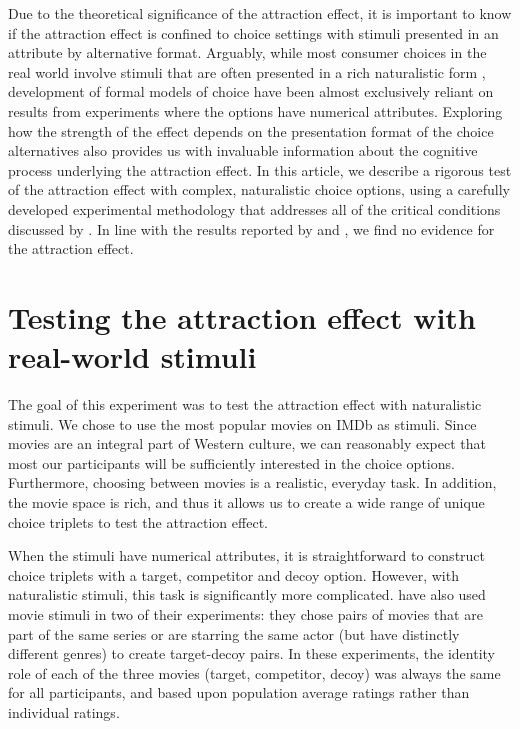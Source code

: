 \documentclass[12pt, a4paper]{article}
\begin{document}
Due to the theoretical significance of the attraction effect, it is important to know if the attraction effect is confined to choice settings with stimuli presented in an attribute by alternative format. Arguably, while most consumer choices in the real world involve stimuli that are often presented in a rich naturalistic form \cite{Bhatia2018b}, development of formal models of choice have been almost exclusively reliant on results from experiments where the options have numerical attributes. Exploring how the strength of the effect depends on the presentation format of the choice alternatives also provides us with invaluable information about the cognitive process underlying the attraction effect. In this article, we describe a rigorous test of the attraction effect with complex, naturalistic choice options, using a carefully developed experimental methodology that addresses all of the critical conditions discussed by . In line with the results reported by  and , we find no evidence for the attraction effect.


\section*{Testing the attraction effect with real-world stimuli}

The goal of this experiment was to test the attraction effect with naturalistic stimuli. We chose to use the most popular movies on IMDb as stimuli. Since movies are an integral part of Western culture, we can reasonably expect that most our participants will be sufficiently interested in the choice options. Furthermore, choosing between movies is a realistic, everyday task. In addition, the movie space is rich, and thus it allows us to create a wide range of unique choice triplets to test the attraction effect.

When the stimuli have numerical attributes, it is straightforward to construct choice triplets with a target, competitor and decoy option. 
However, with naturalistic stimuli, this task is significantly more complicated.   have also used movie stimuli in two of their experiments: they chose pairs of movies that are part of the same series or are starring the same actor (but have distinctly different genres) to create target-decoy pairs. In these experiments, the identity role of each of the three movies (target, competitor, decoy) was always the same for all participants, and based upon population average ratings rather than individual ratings.
\end{document}
